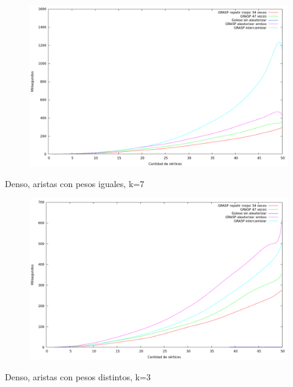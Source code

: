 \begin{figure}[H]
  \begin{center}
    \includegraphics[scale=0.35]{imagenes/ej6-denso-pesos-iguales-k3-tiempo.png}
  \end{center}
\end{figure}

Denso, aristas con pesos iguales, k=7

\begin{figure}[H]
  \begin{center}
    \includegraphics[scale=0.35]{imagenes/ej6-denso-pesos-iguales-k7-tiempo.png}
  \end{center}
\end{figure}

Denso, aristas con pesos distintos, k=3

